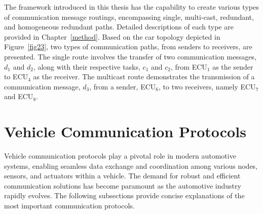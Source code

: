     The framework introduced in this thesis has the capability to create various types of communication message routings, encompassing single, multi-cast, redundant, and homogeneous redundant paths. Detailed descriptions of each type are provided in Chapter~\ref{method}.
    Based on the car topology depicted in Figure~\ref{fig23}, two types of communication paths, from senders to receivers, are presented. The single route involves the transfer of two communication messages, $d_1$ and $d_2$, along with their respective tasks, $c_1$ and $c_2$, from ECU$_1$ as the sender to ECU$_4$ as the receiver. The multicast route demonstrates the transmission of a communication message, $d_3$, from a sender, ECU$_6$, to two receivers, namely ECU$_7$ and ECU$_8$.
    



    \section{Vehicle Communication Protocols}

  Vehicle communication protocols play a pivotal role in modern automotive systems, enabling seamless data exchange and coordination among various nodes, sensors, and actuators within a vehicle. The demand for robust and efficient communication solutions has become paramount as the automotive industry rapidly evolves. The following subsections provide concise explanations of the most important communication protocols.



